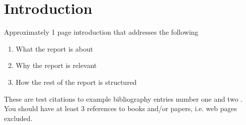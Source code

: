 \documentclass[Main]{subfiles}
\begin{document}
\chapter{Introduction}
Approximately 1 page introduction that addresses the following
\begin{enumerate}
\item What the report is about
\item Why the report is relevant
\item How the rest of the report is structured
\end{enumerate}

These are test citations to example bibliography entries number one
\cite{1989_graham_1} and two \cite{2003_simpson_1}. You should have at
least 3 references to books and/or papers, i.e. web pages excluded.
\end{document}
